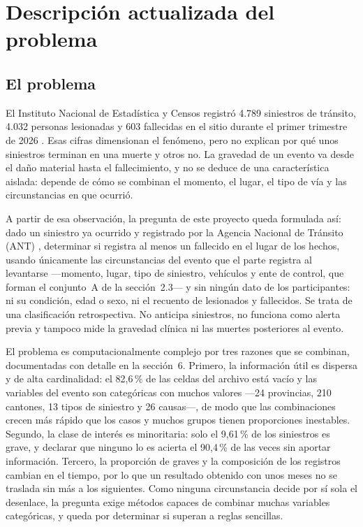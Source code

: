 \section{Descripción actualizada del problema}

\subsection{El problema}

El Instituto Nacional de Estadística y Censos registró 4.789 siniestros de tránsito, 4.032 personas lesionadas y 603 fallecidas en el sitio durante el primer trimestre de 2026 \cite{ref1}. Esas cifras dimensionan el fenómeno, pero no explican por qué unos siniestros terminan en una muerte y otros no. La gravedad de un evento va desde el daño material hasta el fallecimiento, y no se deduce de una característica aislada: depende de cómo se combinan el momento, el lugar, el tipo de vía y las circunstancias en que ocurrió.

A partir de esa observación, la pregunta de este proyecto queda formulada así: dado un siniestro ya ocurrido y registrado por la Agencia Nacional de Tránsito (ANT) \cite{ref2}, determinar si registra al menos un fallecido en el lugar de los hechos, usando únicamente las circunstancias del evento que el parte registra al levantarse ---momento, lugar, tipo de siniestro, vehículos y ente de control, que forman el conjunto~A de la sección~2.3--- y sin ningún dato de los participantes: ni su condición, edad o sexo, ni el recuento de lesionados y fallecidos. Se trata de una clasificación retrospectiva. No anticipa siniestros, no funciona como alerta previa y tampoco mide la gravedad clínica ni las muertes posteriores al evento.

El problema es computacionalmente complejo por tres razones que se combinan, documentadas con detalle en la sección~6. Primero, la información útil es dispersa y de alta cardinalidad: el 82,6\,\% de las celdas del archivo está vacío y las variables del evento son categóricas con muchos valores ---24 provincias, 210 cantones, 13 tipos de siniestro y 26 causas---, de modo que las combinaciones crecen más rápido que los casos y muchos grupos tienen proporciones inestables. Segundo, la clase de interés es minoritaria: solo el 9,61\,\% de los siniestros es grave, y declarar que ninguno lo es acierta el 90,4\,\% de las veces sin aportar información. Tercero, la proporción de graves y la composición de los registros cambian en el tiempo, por lo que un resultado obtenido con unos meses no se traslada sin más a los siguientes. Como ninguna circunstancia decide por sí sola el desenlace, la pregunta exige métodos capaces de combinar muchas variables categóricas, y queda por determinar si superan a reglas sencillas.

